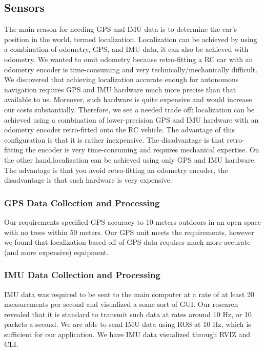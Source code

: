 \documentclass[compsoc,draftclsnofoot,onecolumn,10pt]{IEEEtran}
\begin{document}
\subsection{Sensors}
The main reason for needing GPS and IMU data is to determine the car's position in the world, termed localization. Localization can be achieved by using a combination of odometry, GPS, and IMU data, it can also be achieved with odometry. We wanted to omit odometry because retro-fitting a RC car with an odometry encoder is time-consuming and very technically/mechanically difficult.  We discovered that achieving localization accurate enough for autonomous navigation requires GPS and IMU hardware much more precise than that available to us. Moreover, such hardware is quite expensive and would increase our costs substantially.
Therefore, we see a needed trade off: localization can be achieved using a combination of lower-precision GPS and IMU hardware with an odometry encoder retro-fitted onto the RC vehicle. The advantage of this configuration is that it is rather inexpensive. The disadvantage is that retro-fitting the encoder is very time-consuming and requires mechanical expertise.  On the other hand,localization can be achieved using only GPS and IMU hardware.  The advantage is that you avoid retro-fitting an odometry encoder, the disadvantage is that such hardware is very expensive.

\subsubsection{GPS Data Collection and Processing}
Our requirements specified GPS accuracy to 10 meters outdoors in an open space with no trees within 50 meters.
Our GPS unit meets the requirements, however we found that localization based off of GPS data requires much more accurate (and more expensive) equipment.


\subsubsection{IMU Data Collection and Processing}
IMU data was required to be sent to the main computer at a rate of at least 20 measurements per second and visualized a some sort of GUI.  Our research revealed that it is standard to transmit such data at rates around 10 Hz, or 10 packets a second. We are able to send IMU data using ROS at 10 Hz, which is sufficient for our application.  We have IMU data visualized through RVIZ and CLI.
\end{document}
